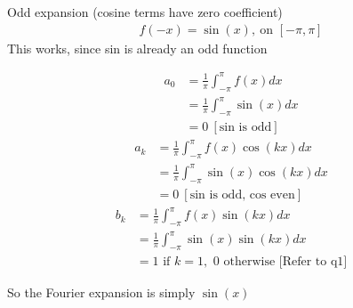 \documentclass{article}
\begin{document}
\begin{enumerate}
\begin{multicols}{2}
    \end{multicols}
    \newpage
    Odd expansion (cosine terms have zero coefficient)
    \begin{align*}
        f(-x) = \sin(x), \: \text{on }[-\pi, \pi]
    \end{align*}
    This works, since sin is already an odd function
    \begin{multicols}{2}
    \noindent
    \begin{align*}
        a_0 &= \frac{1}{\pi}\int_{-\pi}^{\pi}f(x)dx \\ 
        &= \frac{1}{\pi}\int_{-\pi}^{\pi}\sin(x)dx \\ 
        &= 0 \: [\text{sin is odd}]
    \end{align*}
    \begin{align*}
        a_k &= \frac{1}{\pi}\int_{-\pi}^{\pi}f(x)\cos(kx)dx \\ 
        &= \frac{1}{\pi}\int_{-\pi}^{\pi}\sin(x)\cos(kx)dx \\ 
        &= 0 \: [\text{sin is odd, cos even}]
    \end{align*}
    \begin{align*}
        b_k &= \frac{1}{\pi}\int_{-\pi}^{\pi}f(x)\sin(kx)dx \\ 
        &= \frac{1}{\pi}\int_{-\pi}^{\pi}\sin(x)\sin(kx)dx \\ 
        &= 1 \text{ if } k = 1, \text{ 0 otherwise [Refer to q1]}
    \end{align*}
    \end{multicols}
    So the Fourier expansion is simply $\sin(x)$
\end{enumerate}

    \newpage
\end{document}
